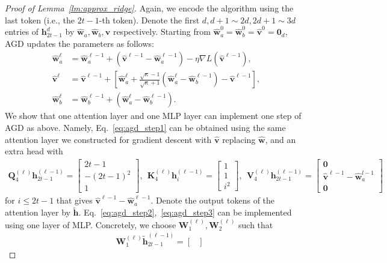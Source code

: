 \documentclass[10pt]{article}
\renewcommand{\hat}{\widehat}
\newcommand{\<}{\left\langle}
\renewcommand{\>}{\right\rangle}
\renewcommand{\bQ}{\mathbf{Q}}
\newcommand{\lth}{{(\ell)}}
\newcommand{\bzero}{{\mathbf 0}}
\newcommand{\partd}{{d}}
\def\bK{{\mathbf K}}
\def\bQ{{\mathbf Q}}
\def\bV{{\mathbf V}}
\def\bW{{\mathbf W}}
\def\bh{{\mathbf h}}
\def\bv{{\mathbf v}}
\def\bw{{\mathbf w}}
\begin{document}
\begin{proof}[Proof of Lemma~\ref{lm:approx_ridge}]
Again, we encode the algorithm using the last token (i.e., the $2t-1$-th token).
Denote the first $d,d+1\sim 2d, 2d+1\sim3d $ entries of $\bh_{2t-1}^{\partd}$ by $\hat\bw_a,\hat\bw_b,\hat\bv$ respectively. Starting from $\hat\bw_a^{0}=\hat\bw_b^{0}=\hat\bv^{0}=\bzero_d$,  AGD updates the parameters as follows:
\begin{subequations}
\begin{align}
    \hat\bw^\ell_a&=\hat\bw_a^{\ell-1}+(\hat\bv^{\ell-1}-\hat\bw_a^{\ell-1})-\eta \nabla L(\hat\bv^{\ell-1}),\label{eq:agd_step1}\\
    \hat\bv^{\ell}&=\hat\bv^{\ell-1}+[\hat\bw^\ell_a+\frac{\sqrt{\kappa}-1}{\sqrt{\kappa}+1}(\hat\bw^\ell_a-\hat\bw^{\ell-1}_b)-\hat\bv^{\ell-1}],\label{eq:agd_step2}\\
    \hat\bw^\ell_b&= \hat\bw^{\ell-1}_b+( \hat\bw^\ell_a-\hat\bw^{\ell-1}_b).\label{eq:agd_step3}
\end{align}
\end{subequations}
We show that one attention layer and one MLP layer can implement one step of AGD as above. Namely, Eq.~\eqref{eq:agd_step1} can be obtained using the same attention layer we constructed for gradient descent with $\hat\bv$ replacing $\hat\bw$, and an extra head with
\begin{align*}
     \bQ_4^{(\ell)}\bh^{(\ell-1)}_{2t-1}=\begin{bmatrix}
         2t-1\\-(2t-1)^2\\ 1
    \end{bmatrix},~~ \bK_4^{(\ell)}\bh^{(\ell-1)}_{i}=\begin{bmatrix}
        1\\ 1 \\i^2
    \end{bmatrix},~~ \bV_4^{(\ell)}\bh^{(\ell-1)}_{2t-1}=\begin{bmatrix}
        \bzero\\ \hat\bv^{\ell-1}-\hat\bw_a^{l-1}\\ \bzero
    \end{bmatrix}
\end{align*} for $i\leq 2t-1$ that gives $\hat\bv^{\ell-1}-\hat\bw_a^{\ell-1}$.
Denote the output tokens of the attention layer by $\tilde \bh$. Eq.~\eqref{eq:agd_step2},~\eqref{eq:agd_step3} can be implemented using one layer of MLP. Concretely, we choose $\bW_{1}^\lth,\bW_{2}^\lth$ such that
\begin{align*}
     &\bW_1^{(\ell)}\tilde\bh^{(\ell-1)}_{2t-1}=\begin{bmatrix}

\end{bmatrix}
\end{align*}
\end{proof}
\end{document}
